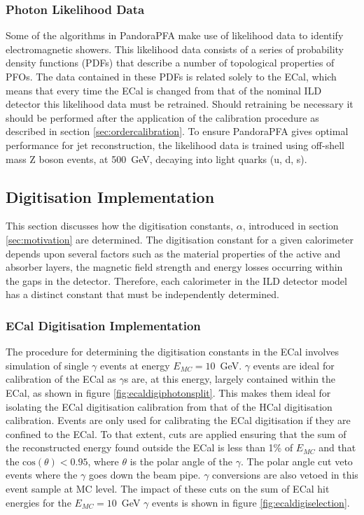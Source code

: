 \subsubsection{Photon Likelihood Data}
Some of the algorithms in PandoraPFA make use of likelihood data to identify electromagnetic showers.  This likelihood data consists of a series of probability density functions (PDFs) that describe a number of topological properties of PFOs.  The data contained in these PDFs is related solely to the ECal, which means that every time the ECal is changed from that of the nominal ILD detector this likelihood data must be retrained.  Should retraining be necessary it should be performed after the application of the calibration procedure as described in section \ref{sec:ordercalibration}.  To ensure PandoraPFA gives optimal performance for jet reconstruction, the likelihood data is trained using off-shell mass Z boson events, at 500~GeV, decaying into light quarks (u, d, s).  


\subsection{Digitisation Implementation}
\label{sec:digi}
This section discusses how the digitisation constants, $\alpha$, introduced in section \ref{sec:motivation} are determined.  The digitisation constant for a given calorimeter depends upon several factors such as the material properties of the active and absorber layers, the magnetic field strength and energy losses occurring within the gaps in the detector.  Therefore, each calorimeter in the ILD detector model has a distinct constant that must be independently determined. 


\subsubsection{ECal Digitisation Implementation}
\label{sec:ecaldigi}
The procedure for determining the digitisation constants in the ECal involves simulation of single $\gamma$ events at energy $E_{MC} = 10$~GeV.  $\gamma$ events are ideal for calibration of the ECal as $\gamma$s are, at this energy, largely contained within the ECal, as shown in figure \ref{fig:ecaldigiphotonsplit}.  This makes them ideal for isolating the ECal digitisation calibration from that of the HCal digitisation calibration.  Events are only used for calibrating the ECal digitisation if they are confined to the ECal.  To that extent, cuts are applied ensuring that the sum of the reconstructed energy found outside the ECal is less than 1\% of $E_{MC}$ and that the $\text{cos}(\theta) < 0.95$, where $\theta$ is the polar angle of the $\gamma$.  The polar angle cut veto events where the $\gamma$ goes down the beam pipe.  $\gamma$ conversions are also vetoed in this event sample at MC level.  The impact of these cuts on the sum of ECal hit energies for the $E_{MC} = 10$~GeV $\gamma$ events is shown in figure \ref{fig:ecaldigiselection}.

